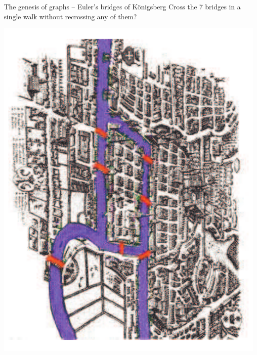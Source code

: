 \documentclass[aspectratio=169]{beamer}\usepackage[]{graphicx}\usepackage[]{xcolor}
\begin{document}
\begin{frame}{The genesis of graphs -- Euler's bridges of K\"onigsberg}
	Cross the 7 bridges in a single walk without recrossing any of them?
	\begin{center}
	\includegraphics[angle=90,height=.75\textheight]{FIGS_slides/bridge_color}
	\end{center}
\end{frame}
\end{document}
